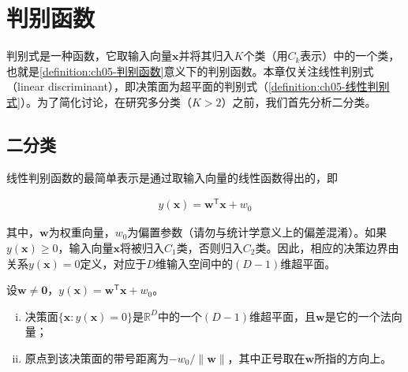 \documentclass[../../main.tex]{subfiles}
\begin{document}
\section{判别函数}\label{section:ch05-判别函数}

判别式是一种函数，它取输入向量$\boldsymbol{x}$并将其归入$K$个类（用$C_k$表示）中的一个类，也就是\cref{definition:ch05-判别函数}意义下的判别函数。本章仅关注线性判别式（linear discriminant），即决策面为超平面的判别式（\cref{definition:ch05-线性判别式}）。为了简化讨论，在研究多分类（$K>2$）之前，我们首先分析二分类。

\subsection{二分类}\label{subsection:ch05-二分类}

线性判别函数的最简单表示是通过取输入向量的线性函数得出的，即

\begin{align}
  y(\boldsymbol{x})=\boldsymbol{w}^{\mathsf{T}}\boldsymbol{x}+w_0
  \label{align:ch05-线性判别}
\end{align}

其中，$\boldsymbol{w}$为权重向量，$w_0$为偏置参数（请勿与统计学意义上的偏差混淆）。如果$y(\boldsymbol{x})\geqslant 0$，输入向量$\boldsymbol{x}$将被归入$C_1$类，否则归入$C_2$类。因此，相应的决策边界由关系$y(\boldsymbol{x})=0$定义，对应于$D$维输入空间中的$(D-1)$维超平面。

\begin{proposition}[决策面的几何性质]\label{proposition:ch05-决策面几何}
设$\boldsymbol{w}\neq\boldsymbol{0}$，$y(\boldsymbol{x})=\boldsymbol{w}^{\mathsf{T}}\boldsymbol{x}+w_0$。
\begin{enumerate}[(i)]
  \item 决策面$\{\boldsymbol{x}:y(\boldsymbol{x})=0\}$是$\mathbb{R}^{D}$中的一个$(D-1)$维超平面，且$\boldsymbol{w}$是它的一个法向量；
  \item 原点到该决策面的带号距离为$-w_0/\lVert\boldsymbol{w}\rVert$，其中正号取在$\boldsymbol{w}$所指的方向上。
\end{enumerate}
\end{proposition}
\end{document}
